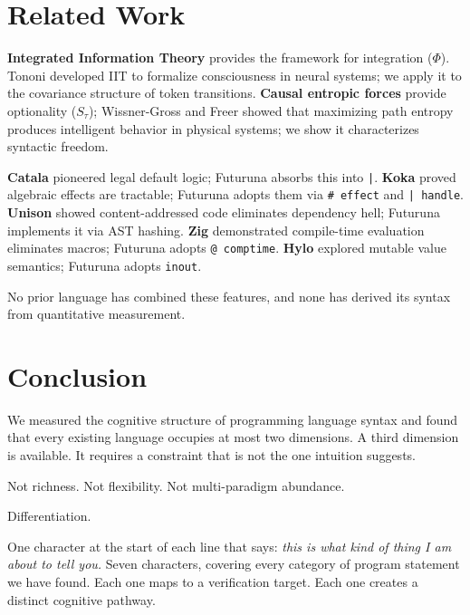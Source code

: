 \documentclass[11pt,a4paper]{article}
\newcommand{\Stau}{S_\tau}
\begin{document}
\section{Related Work}

\textbf{Integrated Information Theory} \cite{Tononi2004} provides the framework for integration ($\Phi$). Tononi developed IIT to formalize consciousness in neural systems; we apply it to the covariance structure of token transitions. \textbf{Causal entropic forces} \cite{WissnerGross2013} provide optionality ($\Stau$); Wissner-Gross and Freer showed that maximizing path entropy produces intelligent behavior in physical systems; we show it characterizes syntactic freedom.

\textbf{Catala} \cite{Merigoux2021} pioneered legal default logic; Futuruna absorbs this into \texttt{|}. \textbf{Koka} \cite{Leijen2017} proved algebraic effects are tractable; Futuruna adopts them via \texttt{\# effect} and \texttt{| handle}. \textbf{Unison} \cite{Chiusano2019} showed content-addressed code eliminates dependency hell; Futuruna implements it via AST hashing. \textbf{Zig} demonstrated compile-time evaluation eliminates macros; Futuruna adopts \texttt{@ comptime}. \textbf{Hylo} explored mutable value semantics; Futuruna adopts \texttt{inout}.

No prior language has combined these features, and none has derived its syntax from quantitative measurement.

\section{Conclusion}

We measured the cognitive structure of programming language syntax and found that every existing language occupies at most two dimensions. A third dimension is available. It requires a constraint that is not the one intuition suggests.

Not richness. Not flexibility. Not multi-paradigm abundance.

Differentiation.

One character at the start of each line that says: \emph{this is what kind of thing I am about to tell you.} Seven characters, covering every category of program statement we have found. Each one maps to a verification target. Each one creates a distinct cognitive pathway.
\end{document}
